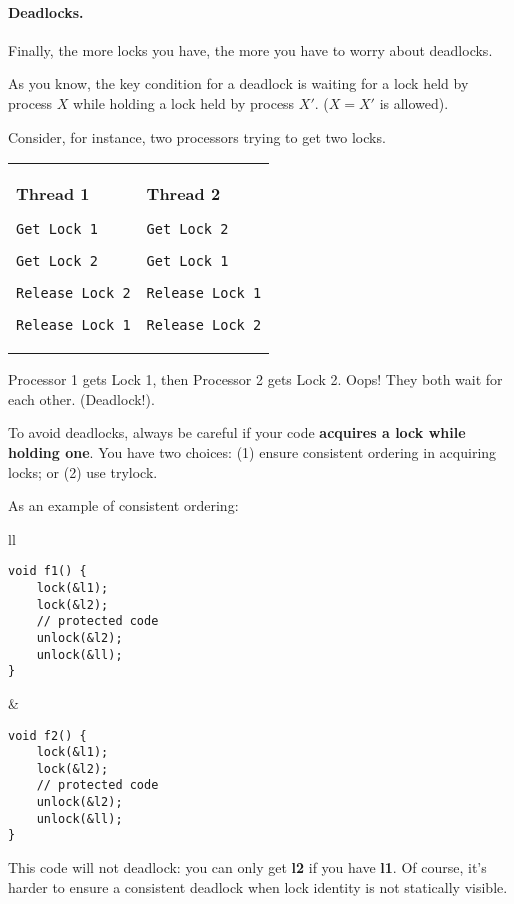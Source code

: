 \documentclass[11pt]{article}
\begin{document}
\paragraph{Deadlocks.} Finally, the more locks you have, the more you have to worry about deadlocks.

As you know, the key condition for a deadlock is waiting for a lock held by process $X$ while holding
a lock held by process $X'$. ($X = X'$ is allowed).

\newpage
Consider, for instance, two processors trying to get two locks.

\begin{center}
  \begin{tabular}{ll}
\begin{minipage}{.4\textwidth}
      {\bf Thread 1}

      \verb+Get Lock 1+

      \verb+Get Lock 2+

      \verb+Release Lock 2+

      \verb+Release Lock 1+
\end{minipage} & 
\begin{minipage}{.4\textwidth}
      {\bf Thread 2}

      \verb+Get Lock 2+

      \verb+Get Lock 1+

      \verb+Release Lock 1+

      \verb+Release Lock 2+
\end{minipage}
\end{tabular}
\end{center}

 Processor 1 gets Lock 1, then Processor 2 gets Lock 2. Oops! They
 both wait for each other. (Deadlock!).

To avoid deadlocks, always be careful if your code {\bf acquires a
  lock while holding one}.  You have two choices: (1) ensure
consistent ordering in acquiring locks; or (2) use trylock.

As an example of consistent ordering:
\begin{center}
\begin{tabular}{ll}
\begin{minipage}{.4\textwidth}
  \begin{lstlisting}
void f1() {
    lock(&l1);
    lock(&l2);
    // protected code
    unlock(&l2);
    unlock(&ll);    
}
\end{lstlisting}
\end{minipage}&
\begin{minipage}{.4\textwidth}
\begin{lstlisting}
void f2() {
    lock(&l1);
    lock(&l2);
    // protected code
    unlock(&l2);
    unlock(&ll);    
}
  \end{lstlisting}
\end{minipage}
\end{tabular}
\end{center}
This code will not deadlock: you can only get {\bf l2} if you have
{\bf l1}. Of course, it's harder to ensure a consistent deadlock when lock
identity is not statically visible.
\end{document}
